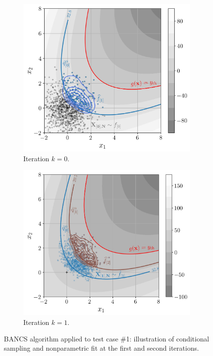 \begin{figure}[!ht]
    \centering
    \begin{subfigure}[b]{0.49\linewidth}
        \centering
        \includegraphics[width=\linewidth]{part3/figures/BANCS/bancs_illustration0.jpg}
        \caption{Iteration $k=0$.}
    \end{subfigure}
    \begin{subfigure}[b]{0.49\linewidth}
        \centering
        \includegraphics[width=\linewidth]{part3/figures/BANCS/bancs_illustration1.jpg}
        \caption{Iteration $k=1$.}
    \end{subfigure}
    \caption{BANCS algorithm applied to test case \#1: illustration of conditional sampling and nonparametric fit at the first and second iterations.}
    \label{fig:bancs_illustration}
\end{figure}

